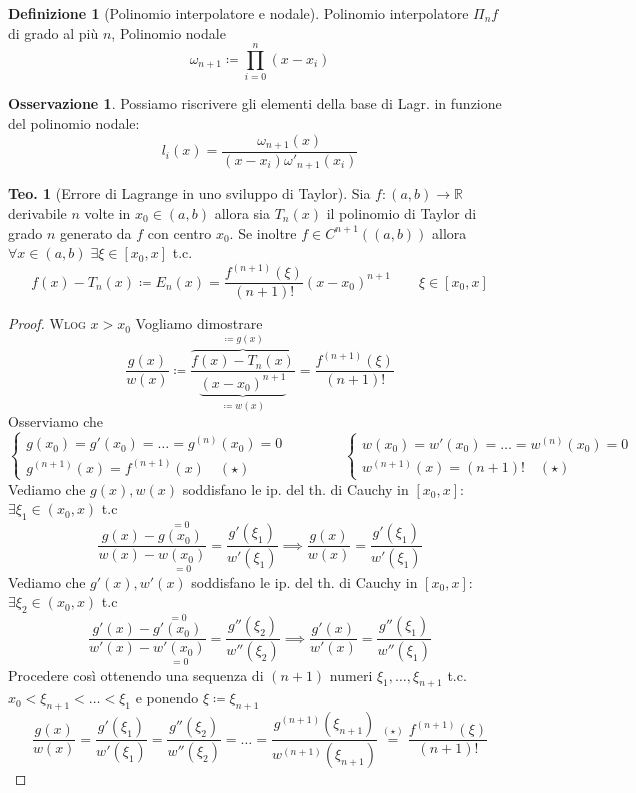 \documentclass[a4paper,10pt]{article}
\theoremstyle{definition}
\newcommand{\noun}[1]{\textsc{#1}}
\newcommand{\re}{\mathbb{R}} %
\theoremstyle{indentdefinition}
\newtheorem{defn}{Definizione}[section]
\theoremstyle{indenttheorem}
\newtheorem{thm}{Teo.}
\theoremstyle{myremark}
\newtheorem*{rem*}{Osservazione}
\theoremstyle{indentgeneral}
\theoremstyle{plain}
\theoremstyle{plain}
\newenvironment{myboxed} 
{\noindent\begin{lrbox}{\mybox}\begin{minipage}{\textwidth}}
{\end{minipage}\end{lrbox}\fbox{\usebox{\mybox}}}
\begin{document}
\begin{defn}[Polinomio interpolatore e nodale]
Polinomio interpolatore $\Pi_{n}f$ di grado al più $n$, Polinomio
nodale $$\omega_{n+1}\coloneqq\prod_{i=0}^n(x-x_i)$$
\end{defn}

\begin{rem*}
    Possiamo riscrivere gli elementi della base di Lagr. in funzione del polinomio nodale:
    $$l_i(x)=\frac{\omega_{n+1}(x)}{(x-x_i)\omega'_{n+1}(x_i)}$$
\end{rem*}

\begin{myboxed}
\begin{thm}[Errore di Lagrange in uno sviluppo di Taylor] Sia $f:(a,b)\to \re $ derivabile $n$ volte in $x_0\in (a,b)$ allora sia $T_n(x)$ il polinomio di Taylor di grado $n$ generato da $f$ con centro $x_0$. Se inoltre $f\in C^{n+1}((a,b))$ allora $\forall x\in(a,b)\;\exists \xi\in[x_0,x]$ t.c.
$$f(x)-T_n(x)\coloneqq E_n(x)=\frac{f^{\left(n+1\right)}\left(\xi\right)}{\left(n+1\right)!}(x-x_0)^{n+1}\qquad \xi\in[x_0,x]$$
\end{thm}
\end{myboxed}

\begin{proof}
    \noun{Wlog} $x>x_0$ Vogliamo dimostrare
    $$\frac{g(x)}{w(x)}\coloneqq\frac{\overbrace{f(x)-T_n(x)}^{\coloneqq g(x)}}{\underbrace{(x-x_0)^{n+1}}_{\coloneqq w(x)}}=\frac{f^{\left(n+1\right)}\left(\xi\right)}{\left(n+1\right)!}$$
    Osserviamo che 
    $$\begin{cases}
        g(x_0)=g'(x_0)=\dots=g^{(n)}(x_0)=0\\
        g^{(n+1)}(x)=f^{(n+1)}(x) \quad (\star)
    \end{cases}\qquad\qquad \begin{cases}
        w(x_0)=w'(x_0)=\dots=w^{(n)}(x_0)=0\\
        w^{(n+1)}(x)=(n+1)! \quad (\star)
    \end{cases}$$
    Vediamo che $g(x),w(x)$ soddisfano le ip. del th. di Cauchy in $[x_0,x]$: $\exists\xi_1\in(x_0,x)$ t.c
    $$\frac{g(x)-\overset{=0}{g(x_0)}}{w(x)-\underset{=0}{w(x_0)}}=\frac{g'(\xi_1)}{w'(\xi_1)}\implies \frac{g(x)}{w(x)}=\frac{g'(\xi_1)}{w'(\xi_1)}$$
    Vediamo che $g'(x),w'(x)$ soddisfano le ip. del th. di Cauchy in $[x_0,x]$: $\exists\xi_2\in(x_0,x)$ t.c
    $$\frac{g'(x)-\overset{=0}{g'(x_0)}}{w'(x)-\underset{=0}{w'(x_0)}}=\frac{g''(\xi_2)}{w''(\xi_2)}\implies \frac{g'(x)}{w'(x)}=\frac{g''(\xi_1)}{w''(\xi_1)}$$
    Procedere così ottenendo una sequenza di $(n+1)$ numeri $\xi_1,\dots,\xi_{n+1}$ t.c. $x_0<\xi_{n+1}<\dots<\xi_1$ e ponendo $\xi\coloneqq\xi_{n+1}$
    $$\frac{g(x)}{w(x)}=\frac{g'(\xi_1)}{w'(\xi_1)}=\frac{g''(\xi_2)}{w''(\xi_2)}=\dots=\frac{g^{(n+1)}(\xi_{n+1})}{w^{(n+1)}(\xi_{n+1})}\overset{(\star)}{=}\frac{f^{\left(n+1\right)}\left(\xi\right)}{\left(n+1\right)!}$$
\end{proof}
\end{document}
